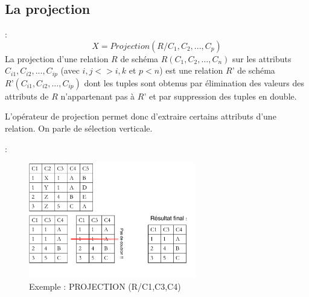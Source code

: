 \documentclass[10pt]{beamer}
\begin{document}
\subsection{La projection}
\begin{frame}{\secname : \subsecname}
    $$
        X = Projection(R / C_1,C_2,...,C_p)
    $$
    La projection d’une relation $R$ de schéma $R (C_1, C_2, …, C_n)$ sur les attributs $C_{i1}, C_{i2},..., C_{ip}$ (avec $i,j <> i,k$ et $p < n$) est une relation $R’$ de schéma $R’ (C_{i1}, C_{i2},..., C_{ip})$ dont les tuples sont obtenus par élimination des valeurs des attributs de $R$ n’appartenant pas à $R’$ et par suppression des tuples en double.

    L’opérateur de projection permet donc d’extraire certains attributs d’une relation.  On parle de sélection verticale.
\end{frame}

\begin{frame}{\secname : \subsecname}
    \begin{figure}
        \begin{center}
            \includegraphics[width=0.65\textwidth]{../assets/img/projection_1.pdf}
            \caption*{Exemple : PROJECTION (R/C1,C3,C4)}
            \label{Fig:projection_1}
        \end{center}
    \end{figure}
\end{frame}
\end{document}
